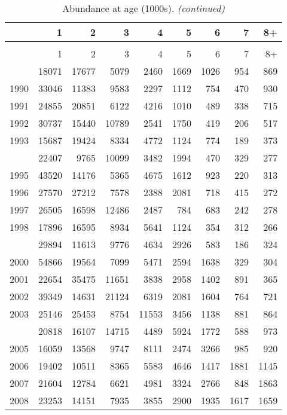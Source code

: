 \documentclass[
]{article}
\begin{document}
\begin{longtable}[t]{lrrrrrrrr}
\caption{\label{tab:NAA-table}Abundance at age (1000s).}\\
\toprule
  & 1 & 2 & 3 & 4 & 5 & 6 & 7 & 8+\\
\midrule
\endfirsthead
\caption[]{Abundance at age (1000s). \textit{(continued)}}\\
\toprule
  & 1 & 2 & 3 & 4 & 5 & 6 & 7 & 8+\\
\midrule
\endhead

\endfoot
\bottomrule
\endlastfoot
1989 & 18071 & 17677 & 5079 & 2460 & 1669 & 1026 & 954 & 869\\
1990 & 33046 & 11383 & 9583 & 2297 & 1112 & 754 & 470 & 930\\
1991 & 24855 & 20851 & 6122 & 4216 & 1010 & 489 & 338 & 715\\
1992 & 30737 & 15440 & 10789 & 2541 & 1750 & 419 & 206 & 517\\
1993 & 15687 & 19424 & 8334 & 4772 & 1124 & 774 & 189 & 373\\
\addlinespace
1994 & 22407 & 9765 & 10099 & 3482 & 1994 & 470 & 329 & 277\\
1995 & 43520 & 14176 & 5365 & 4675 & 1612 & 923 & 220 & 313\\
1996 & 27570 & 27212 & 7578 & 2388 & 2081 & 718 & 415 & 272\\
1997 & 26505 & 16598 & 12486 & 2487 & 784 & 683 & 242 & 278\\
1998 & 17896 & 16595 & 8934 & 5641 & 1124 & 354 & 312 & 266\\
\addlinespace
1999 & 29894 & 11613 & 9776 & 4634 & 2926 & 583 & 186 & 324\\
2000 & 54866 & 19564 & 7099 & 5471 & 2594 & 1638 & 329 & 304\\
2001 & 22654 & 35475 & 11651 & 3838 & 2958 & 1402 & 891 & 365\\
2002 & 39349 & 14631 & 21124 & 6319 & 2081 & 1604 & 764 & 721\\
2003 & 25146 & 25453 & 8754 & 11553 & 3456 & 1138 & 881 & 864\\
\addlinespace
2004 & 20818 & 16107 & 14715 & 4489 & 5924 & 1772 & 588 & 973\\
2005 & 16059 & 13568 & 9747 & 8111 & 2474 & 3266 & 985 & 920\\
2006 & 19402 & 10511 & 8365 & 5583 & 4646 & 1417 & 1881 & 1145\\
2007 & 21604 & 12784 & 6621 & 4981 & 3324 & 2766 & 848 & 1863\\
2008 & 23253 & 14151 & 7935 & 3855 & 2900 & 1935 & 1617 & 1659\\

\end{longtable}
\end{document}
